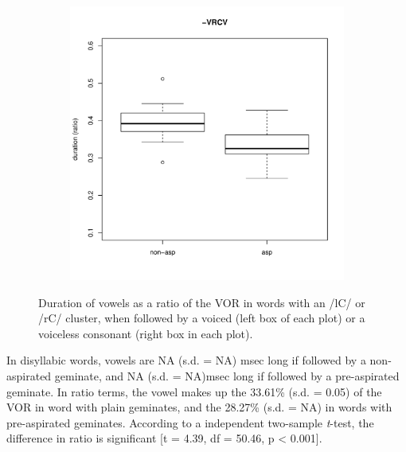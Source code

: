 \documentclass[11pt,a4paper,oneside,openany]{memoir}\usepackage[]{graphicx}\usepackage[]{color}
\newenvironment{knitrout}{}{} %
\begin{document}
\begin{figure}
\begin{subfigure}{.5\textwidth}
\begin{knitrout}
\end{knitrout}
\end{subfigure}
\begin{subfigure}{.5\textwidth}
\centering
\begin{knitrout}
\color{fgcolor}
\includegraphics[width=\textwidth]{img/di-rho-box-1} 

\end{knitrout}
\end{subfigure}
\caption[Duration of vowels as a ratio of the VOR in  words with an /lC/ and /rC/ cluster.]{Duration of vowels as a ratio of the VOR in words with an /lC/ or /rC/ cluster, when followed by a voiced (left box of each plot) or a voiceless consonant (right box in each plot).}
\label{f:voweldurrho}
\end{figure}



In disyllabic words, vowels are NA (s.d. = NA) msec long if followed by a non-aspirated geminate, and NA (s.d. = NA)msec long if followed by a pre-aspirated geminate.
In ratio terms, the vowel makes up the 33.61\% (s.d. = 0.05) of the VOR in word with plain geminates, and the 28.27\% (s.d. = NA) in words with pre-aspirated geminates.
According to a independent two-sample \textit{t}-test, the difference in ratio is significant [t = 4.39, df = 50.46, p < 0.001].
\end{document}
